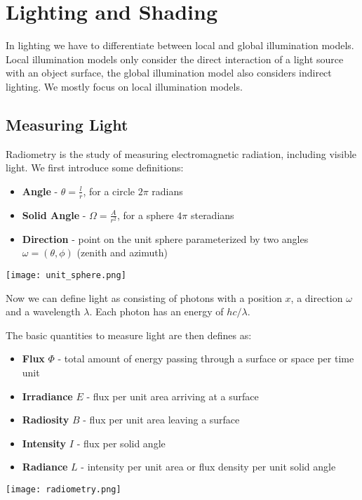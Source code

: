 \section{Lighting and Shading}

In lighting we have to differentiate between local and global illumination models. Local illumination models only consider the direct interaction of a light source with an object surface, the global illumination model also considers indirect lighting. We mostly focus on local illumination models.


\subsection{Measuring Light}

Radiometry is the study of measuring electromagnetic radiation, including visible light. We first introduce some definitions:
\begin{itemize}
	\item \textbf{Angle} - $\theta = \frac{l}{r}$, for a circle $2 \pi$ radians
	\item \textbf{Solid Angle} - $\Omega = \frac{A}{r^2}$, for a sphere $4 \pi$ steradians
	\item \textbf{Direction} - point on the unit sphere parameterized by two angles $\omega = (\theta, \phi)$ (zenith and azimuth)
\end{itemize}

\begin{center}
	\texttt{[image: unit\_sphere.png]}
\end{center}

Now we can define light as consisting of photons with a position $x$, a direction $\omega$ and a wavelength $\lambda$. Each photon has an energy of $hc / \lambda$. \medskip

The basic quantities to measure light are then defines as:
\begin{itemize}
	\item \textbf{Flux} $\Phi$ - total amount of energy passing through a surface or space per time unit
	\item \textbf{Irradiance} $E$ - flux per unit area arriving at a surface 
	\item \textbf{Radiosity} $B$ - flux per unit area leaving a surface 
	\item \textbf{Intensity} $I$ - flux per solid angle 
	\item \textbf{Radiance} $L$ - intensity per unit area or flux density per unit solid angle 
\end{itemize}
\begin{center}
	\texttt{[image: radiometry.png]}
\end{center}


